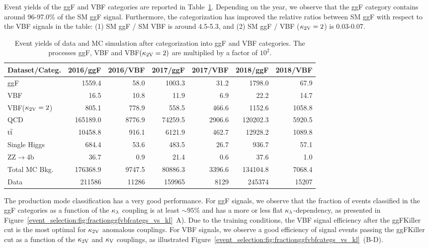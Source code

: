 Event yields of the ggF and VBF categories are reported in Table~\ref{event_selection:tab:categorization}. Depending on the year, we observe that the ggF category contains around 96-97.0\% of the SM ggF signal. Furthermore, the categorization has improved the relative ratios between SM ggF with respect to the VBF signals in the table: (1) SM ggF / SM VBF is around 4.5-5.3, and (2) SM ggF / VBF ($\mathrm{\kappa_{2V} }=2$) is 0.03-0.07.

\begin{table}[htb]
\caption[Event yields of data and MC simulation after categorization into ggF and VBF categories]{\label{event_selection:tab:categorization}Event yields of data and MC simulation after categorization into ggF and VBF categories. The processes ggF, VBF and VBF$(\mathrm{\kappa_{2V} }=2)$ are multiplied by a factor of $10^{2}$.}
\centering
\begin{tabularx}{\textwidth}{l r r r r r r}
   	\hline
	Dataset/Categ.            & 2016/ggF       &   2016/VBF     &    2017/ggF    & 2017/VBF       & 2018/ggF       &  2018/VBF     \\
	\hline
	ggF             &    1559.4 &      58.0 &    1003.3 &      31.2 &    1798.0 &      67.9 \\
	VBF              &      16.5 &      10.8 &      11.9 &       6.9 &      22.2 &      14.7 \\
	VBF($\mathrm{\kappa_{2V} }=2$)   &     805.1 &     778.9 &     558.5 &     466.6 &    1152.6 &    1058.8 \\
	QCD                       &  165189.0 &    8776.9 &   74259.5 &    2906.6 &  120202.3 &    5920.5 \\
	$\mathrm{t\overline{t}}$                  &   10458.8 &     916.1 &    6121.9 &     462.7 &   12928.2 &    1089.8 \\
	Single Higgs              &     684.4 &      53.6 &     483.5 &      26.7 &     936.7 &      57.1 \\
	ZZ$\rightarrow$4b         &      36.7 &       0.9 &      21.4 &       0.6 &      37.6 &       1.0 \\
	Total MC Bkg.             &  176368.9 &    9747.5 &   80886.3 &    3396.6 &  134104.8 &    7068.4 \\
	Data                      &  211586 &   11286 &  159965 &    8129 &  245374 &   15207 \\
	\hline
\end{tabularx}
\end{table}

The production mode classification has a very good performance. For ggF signals, we observe that the fraction of events classified in the ggF categories as a function of the $\kappa_{\lambda}$ coupling is at least $\sim95\%$ and has a more or less flat $\kappa_{\lambda}$-dependency, as presented in Figure~\ref{event_selection:fig:fractionggfvbfcategs_vs_kl}~A).  Due to the training conditions, the VBF signal efficiency after the ggFKiller cut is the most optimal for $\mathrm{\kappa_{2V} }$ anomalous couplings. For VBF signals, we observe a good efficiency of signal events passing the ggFKiller cut as a function of the $\mathrm{\kappa_{2V} }$ and $\mathrm{\kappa_{V} }$ couplings, as illustrated Figure~\ref{event_selection:fig:fractionggfvbfcategs_vs_kl}~(B-D).

